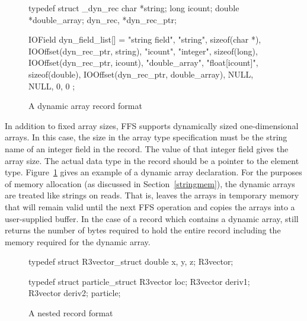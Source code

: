 \begin{figure}
\begin{WrapCode}
typedef struct _dyn_rec {
    char        *string;
    long        icount;
    double      *double_array;
} dyn_rec, *dyn_rec_ptr;

IOField dyn_field_list[] = {
    {"string field", "string", sizeof(char *), 
      IOOffset(dyn_rec_ptr, string)},
    {"icount", "integer", sizeof(long), 
      IOOffset(dyn_rec_ptr, icount)},
    {"double_array", "float[icount]", sizeof(double), 
      IOOffset(dyn_rec_ptr, double_array)},
    { NULL, NULL, 0, 0}
};
\end{WrapCode}
\caption{A dynamic array record format\label{fig:dynarray}}
\end{figure}

In addition to fixed array sizes, FFS supports dynamically sized
one-dimensional arrays.  In this case, the size in the array type
specification must be the string name of an integer field in the record.
The value of that integer field gives the array size.  The actual data type
in the record should be a pointer to the element type.
Figure~\ref{fig:dynarray} gives an example of a dynamic array declaration.
For the purposes of memory allocation (as discussed in
Section~\ref{stringmem}), the dynamic arrays are treated like strings on
reads.  That is,  leaves the arrays in temporary
memory that will remain valid until the next FFS operation and
 copies the arrays into a user-supplied
buffer.  In the case of a record which contains a dynamic array,
 still returns the number of bytes
required to hold the entire record including the memory required for the
dynamic array.

\begin{figure}
\vspace*{-0.25in}
\begin{WrapCode}
 typedef struct R3vector_struct { 
     double x, y, z;
 } R3vector;

 typedef struct particle_struct { 
     R3vector   loc;
     R3vector   deriv1;
     R3vector   deriv2;
 } particle;
\end{WrapCode}
\caption{A nested record format\label{fig:part}}
\end{figure}

